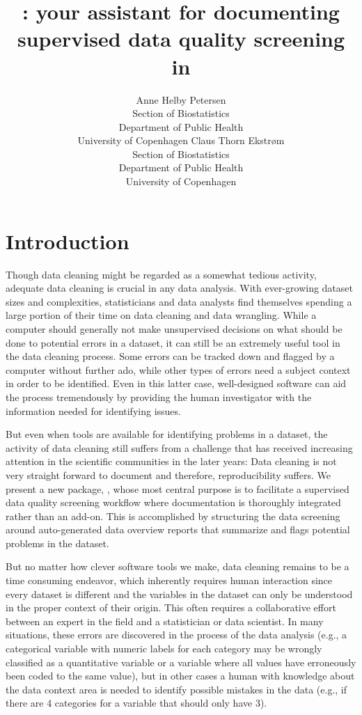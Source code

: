 \documentclass[article,shortnames]{jss}
\author{Anne Helby Petersen\\Section of Biostatistics\\Department of Public
  Health\\University of Copenhagen \And Claus Thorn Ekstr\o m\\Section of Biostatistics\\Department of Public
  Health\\University of Copenhagen}
\title{\pkg{dataMaid}: your assistant for documenting supervised data quality screening in \proglang{R}}
\begin{document}
\section{Introduction}
Though data cleaning might be regarded as a somewhat tedious activity,
adequate data cleaning is crucial in any data analysis. With
ever-growing dataset sizes and complexities, statisticians and data
analysts find themselves spending a large portion of their time on
data cleaning and data wrangling. While a computer should generally not
make unsupervised decisions on what should be done to potential
errors in a dataset, it can still be an extremely useful tool in the
data cleaning process. Some errors can be tracked down and flagged by a
computer without further ado, while other types of errors need a subject
context in order to be identified. Even in this latter case, well-designed
software can aid the process tremendously by providing the human
investigator with the information needed for identifying issues.

But even when tools are available for identifying problems in a
dataset, the activity of data cleaning still suffers from a challenge
that has received increasing attention in the scientific communities
in the later years: Data cleaning is not very straight forward to
document and therefore, reproducibility suffers. We present a new
 package,  \citep{dataMaid}, whose most
central purpose is to facilitate a supervised data quality screening
workflow where documentation is thoroughly integrated rather than an
add-on. This is accomplished by structuring the data screening around
auto-generated data overview reports that summarize and flags
potential problems in the dataset.


But no matter how clever software tools we make, data cleaning remains
to be a time consuming endeavor, which inherently requires human
interaction since every dataset is different and the variables in the
dataset can only be understood in the proper context of their
origin. This often requires a collaborative effort between an expert
in the field and a statistician or data scientist. In many
situations, these errors are discovered in the process of the data
analysis (e.g., a categorical variable with numeric labels for each
category may be wrongly classified as a quantitative variable or a
variable where all values have erroneously been coded to the same
value), but in other cases a human with knowledge about the data
context area is needed to identify possible mistakes in the data
(e.g., if there are 4 categories for a variable that should only have
3).
\end{document}
